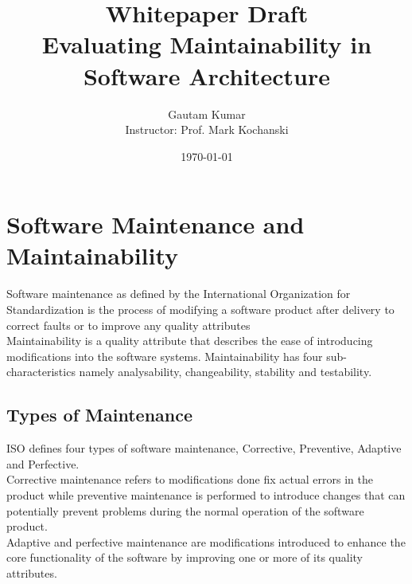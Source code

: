 \documentclass[dvips,12pt]{article}
\begin{document}

\title{Whitepaper Draft\\
Evaluating Maintainability in Software Architecture}
\author{Gautam Kumar\\
Instructor: Prof. Mark Kochanski}
\date{\today}


\maketitle
\newpage
\tableofcontents
\newpage

\section{Software Maintenance and Maintainability}
Software maintenance as defined by the International Organization for Standardization is the process of modifying a software product after delivery to correct faults or to improve any quality attributes \cite{_international_2006} \\

Maintainability is a quality attribute that describes the ease of introducing modifications into the software systems. Maintainability has four sub-characteristics namely analysability, changeability, stability and testability\cite{_international_2006}.\\

\subsection{Types of Maintenance}
ISO defines four types of software maintenance, Corrective, Preventive, Adaptive and Perfective. \\

Corrective maintenance refers to modifications done fix actual errors in the product while preventive maintenance is performed to introduce changes that can potentially prevent problems during the normal operation of the software product. \\

Adaptive and perfective maintenance are modifications introduced to enhance the core functionality of the software by improving one or more of its quality attributes. 
\end{document}
